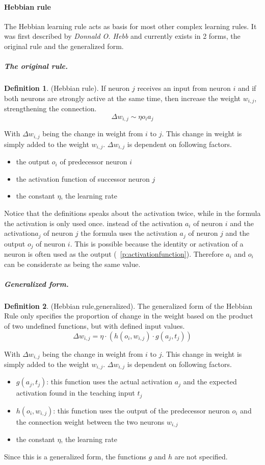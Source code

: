\documentclass[pdftex,a4paper,12pt,twoside]{report}
\theoremstyle{plain} \newtheorem{theorem}{Theorem} \newtheorem{proposition}{Proposition} \newtheorem{lemma}{Lemma} \newtheorem*{corollary}{Corollary}
\theoremstyle{definition} \newtheorem{definition}{Definition} \newtheorem{conjecture}{Conjecture} \newtheorem*{example}{Example} \newtheorem{algorithm}{Algorithm}
\theoremstyle{remark} \newtheorem*{remark}{Remark} \newtheorem*{note}{Note} \newtheorem{case}{Case}
\begin{document}
\paragraph{Hebbian rule}
The Hebbian learning rule acts as basis for most other complex learning rules. It was first described by \emph{Donnald O. Hebb} and currently exists in 2 forms, the original rule and the generalized form.
\subparagraph{The original rule.}
\begin{definition}
(Hebbian rule). If neuron $j$ receives an input from neuron $i$ and if both neurons are strongly active at the same time, then increase the weight $w_{i,j}$, strengthening the connection.
\begin{equation}
\Delta w_{i,j} \sim \eta o_ia_j
\end{equation}
\end{definition}
With $\Delta w_{i,j}$ being the change in weight from $i$ to $j$. This change in weight is simply added to the weight $w_{i,j}$. $\Delta w_{i,j}$ is dependent on following factors.
\begin{itemize}
\item the output $o_i$ of predecessor neuron $i$
\item the activation function of successor neuron $j$
\item the constant $\eta$, the learning rate
\end{itemize}
Notice that the definitions speaks about the activation twice, while in the formula the activation is only used once. instead of the activation $a_i$ of neuron $i$ and the activation$a_j$ of neuron $j$ the formula uses the activation $a_j$ of neuron $j$ and the output $o_j$ of neuron $i$. This is possible because the identity or activation of a neuron is often used as the output (~\ref{p:activationfunction}). Therefore $a_i$ and $o_i$ can be considerate as being the same value.
\subparagraph{Generalized form.}
\begin{definition}
(Hebbian rule,generalized). The generalized form of the Hebbian Rule only specifies the proportion of change in the weight based on the product of two undefined functions, but with defined input values.
\begin{equation}
\Delta w_{i,j} = \eta \cdot (h(o_i,w_{i,j}) \cdot g(a_j,t_j))
\end{equation}
\end{definition}
With $\Delta w_{i,j}$ being the change in weight from $i$ to $j$. This change in weight is simply added to the weight $w_{i,j}$. $\Delta w_{i,j}$ is dependent on following factors.
\begin{itemize}
\item $g(a_j,t_j)$: this function uses the actual activation $a_j$ and the expected activation found in the teaching input $t_j$
\item $h(o_i,w_{i,j})$: this function uses the output of the predecessor neuron $o_i$ and the connection weight between the two neurons $w_{i,j}$
\item the constant $\eta$, the learning rate
\end{itemize}
Since this is a generalized form, the functions $g$ and $h$ are not specified.
\end{document}
